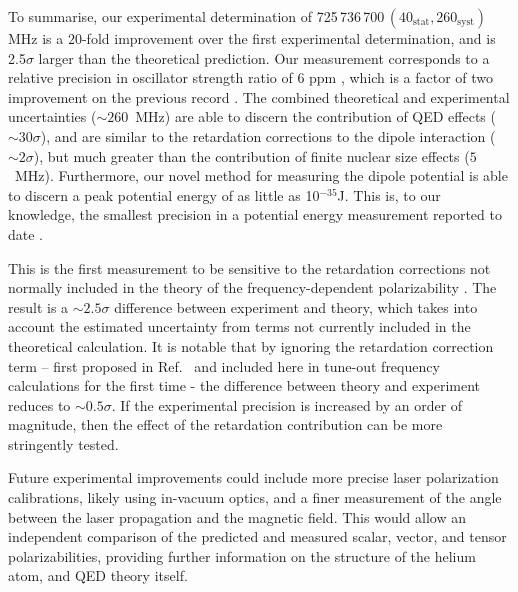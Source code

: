 \documentclass[aps,prl,
reprint,
superscriptaddress,
 amsmath,amssymb,
floatfix
]{revtex4-2}
\begin{document}
 To summarise, our experimental determination of 725\,736\,700\,$(40_{\mathrm{stat}},260_{\mathrm{syst}})$ MHz is a \(20\)-fold improvement over the first experimental determination, and is 2.5$\sigma$ larger than the theoretical prediction. Our measurement corresponds to a relative precision in oscillator strength ratio of 6 ppm \cite{SOMs}, which is a factor of two improvement on the previous record \cite{PhysRevA.88.052515}. The combined theoretical and experimental uncertainties (\({\sim} 260\)~MHz) are able to discern the contribution of QED effects (\({\sim} 30 \sigma\)), and are similar to the retardation corrections to the dipole interaction (\({\sim} 2 \sigma\)), but much greater than the contribution of finite nuclear size effects (\(5\)~MHz). Furthermore, our novel method for measuring the dipole potential is able to discern a peak potential energy of as little as 10$^{-35}$J. This is, to our knowledge, the smallest precision in a potential energy measurement reported to date \cite{SOMs}.

 
 
This is the first measurement to be sensitive to the retardation corrections not normally included in the theory of the frequency-dependent polarizability \cite{Drake2019, PhysRevA.99.041803}. The result is a \({\sim} 2.5 \sigma\) difference between experiment and theory, which takes into account the estimated uncertainty from terms not currently included in the theoretical calculation.  It is notable that by ignoring the retardation correction term – first proposed in Ref.~\cite{PhysRevA.99.041803} and included here in tune-out frequency calculations for the first time - the difference between theory and experiment reduces to \({\sim} 0.5 \sigma\).  If the experimental precision is increased by an order of magnitude, then the effect of the retardation contribution can be more stringently tested.

 
Future experimental improvements could include more precise laser polarization calibrations, likely using in-vacuum optics, and a finer measurement of the angle between the laser propagation and the magnetic field. This would allow an independent comparison of the predicted and measured scalar, vector, and tensor polarizabilities, providing further information on the structure of the helium atom, and QED theory itself.
\end{document}
